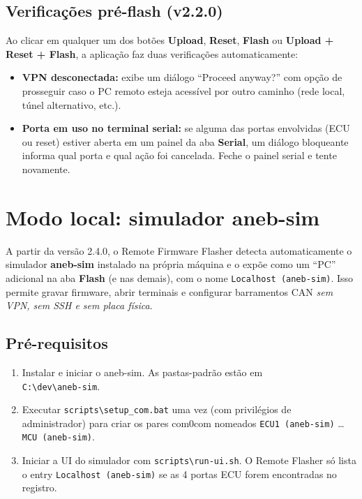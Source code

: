 \documentclass[12pt,a4paper]{article}
\begin{document}
\subsection{Verificações pré-flash (v2.2.0)}

Ao clicar em qualquer um dos botões \textbf{Upload}, \textbf{Reset},
\textbf{Flash} ou \textbf{Upload + Reset + Flash}, a aplicação faz duas
verificações automaticamente:

\begin{itemize}[nosep]
  \item \textbf{VPN desconectada:} exibe um diálogo ``Proceed anyway?''
    com opção de prosseguir caso o PC remoto esteja acessível por outro
    caminho (rede local, túnel alternativo, etc.).
  \item \textbf{Porta em uso no terminal serial:} se alguma das portas
    envolvidas (ECU ou reset) estiver aberta em um painel da aba
    \textbf{Serial}, um diálogo bloqueante informa qual porta e qual ação
    foi cancelada. Feche o painel serial e tente novamente.
\end{itemize}

\section{Modo local: simulador aneb-sim}

A partir da versão 2.4.0, o Remote Firmware Flasher detecta automaticamente o simulador \textbf{aneb-sim} instalado na própria máquina e o expõe como um ``PC'' adicional na aba \textbf{Flash} (e nas demais), com o nome \texttt{Localhost (aneb-sim)}. Isso permite gravar firmware, abrir terminais e configurar barramentos CAN \emph{sem VPN, sem SSH e sem placa física}.

\subsection{Pré-requisitos}

\begin{enumerate}[nosep]
  \item Instalar e iniciar o aneb-sim. As pastas-padrão estão em\\
        \texttt{C:\textbackslash dev\textbackslash aneb-sim}.
  \item Executar \texttt{scripts\textbackslash setup\_com.bat} uma vez (com privilégios de administrador) para criar os pares com0com nomeados \texttt{ECU1 (aneb-sim)} … \texttt{MCU (aneb-sim)}.
  \item Iniciar a UI do simulador com \texttt{scripts\textbackslash run-ui.sh}. O Remote Flasher só lista o entry \texttt{Localhost (aneb-sim)} se as 4 portas ECU forem encontradas no registro.
\end{enumerate}
\end{document}
